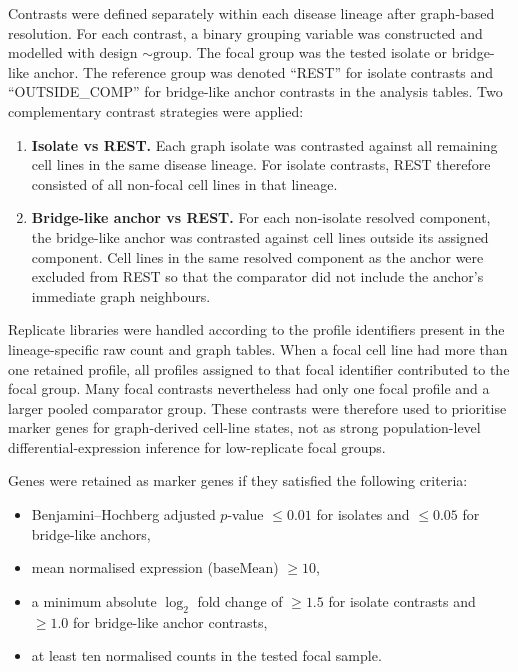 Contrasts were defined separately within each disease lineage after graph-based
resolution. For each contrast, a binary grouping variable was constructed and
modelled with design \(\sim\mathrm{group}\). The focal group was the tested isolate or
bridge-like anchor. The reference group was denoted ``REST'' for isolate
contrasts and ``OUTSIDE\_COMP'' for bridge-like anchor contrasts in the analysis
tables. Two complementary contrast strategies were applied:

\begin{enumerate}
	    \item \textbf{Isolate vs REST.}
	    Each graph isolate was contrasted against all remaining cell lines in the
	    same disease lineage. For isolate contrasts, REST therefore consisted of all
	    non-focal cell lines in that lineage.

	    \item \textbf{Bridge-like anchor vs REST.}
	    For each non-isolate resolved component, the bridge-like anchor was
	    contrasted against cell lines outside its assigned component. Cell lines in
	    the same resolved component as the anchor were excluded from REST so that the
	    comparator did not include the anchor's immediate graph neighbours.
\end{enumerate}

Replicate libraries were handled according to the profile identifiers present
in the lineage-specific raw count and graph tables. When a focal cell line had
more than one retained profile, all profiles assigned to that focal identifier
contributed to the focal group. Many focal contrasts nevertheless had only one
focal profile and a larger pooled comparator group.
These contrasts were therefore used to prioritise marker genes for graph-derived
cell-line states, not as strong population-level differential-expression
inference for low-replicate focal groups.

Genes were retained as marker genes if they satisfied the following criteria:

\begin{itemize}
    \item Benjamini–Hochberg adjusted $p$-value
    $\leq 0.01$ for isolates and
    $\leq 0.05$ for bridge-like anchors,
    \item mean normalised expression
    ($\mathrm{baseMean}$) $\geq 10$,
    \item a minimum absolute $\log_{2}$ fold change of $\geq 1.5$ for isolate contrasts
    and $\geq 1.0$ for bridge-like anchor contrasts,
    \item at least ten normalised counts in the tested focal sample.
\end{itemize}

